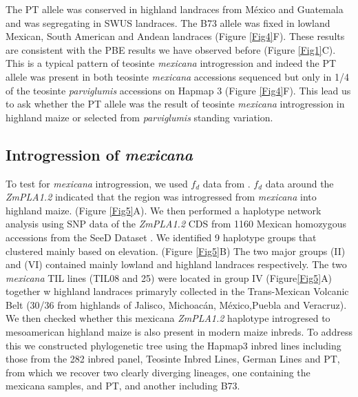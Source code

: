 \documentclass[9pt,twocolumn,twoside,lineno]{BioRxiv}
\begin{document}
The PT allele was conserved in highland landraces from México and Guatemala and was segregating in SWUS landraces. The B73 allele was fixed in lowland Mexican, South American and Andean landraces (Figure \ref{Fig4}F). 
These results are consistent with the PBE results we have observed before (Figure \ref{Fig1}C).
This is a typical pattern of teosinte \textit{mexicana} introgression \cite{Wang2020-mp} and indeed the PT allele was present in both teosinte \textit{mexicana} accessions sequenced but only in 1/4 of the teosinte \textit{parviglumis} accessions on Hapmap 3 \cite{Bukowski2017-ng} (Figure \ref{Fig4}F). 
This lead us to ask whether the PT allele was the result of teosinte \textit{mexicana} introgression in highland maize or selected from \textit{parviglumis} standing variation. 
\subsection{Introgression of \textit{mexicana}} 
To test for \textit{mexicana} introgression, we used \(f_d\) data from \cite{Gonzalez-Segovia2019-jy}.
\(f_d\) data around the \textit{ZmPLA1.2} indicated that the region was introgressed from \textit{mexicana} into highland maize. (Figure \ref{Fig5}A).
We then performed a haplotype network analysis using SNP data of the \textit{ZmPLA1.2} CDS from 1160 Mexican homozygous accessions from the SeeD Dataset \cite{Romero_Navarro2017-cn}. 
We identified 9 haplotype groups that clustered mainly based on elevation. (Figure \ref{Fig5}B) 
The two major groups (II) and (VI) contained mainly lowland and highland landraces respectively. 
The two \textit{mexicana} TIL lines (TIL08 and 25) were located in group IV  (Figure\ref{Fig5}A) together w highland landraces primaryly collected in the Trans-Mexican Volcanic Belt (30/36 from highlands of Jalisco, Michoacán, México,Puebla and Veracruz).
We then checked whether this mexicana \textit{ZmPLA1.2}  haplotype  introgresed to mesoamerican highland maize is also present in modern maize inbreds. 
To address this we constructed phylogenetic tree using the Hapmap3 inbred lines including those from the 282 inbred panel, Teosinte Inbred Lines, German Lines and PT, from which we recover two clearly diverging lineages, one containing the mexicana samples, and PT,  and another including B73.
\end{document}
